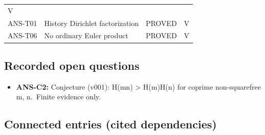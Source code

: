 \documentclass[
  11pt,
]{article}
\providecommand{\tightlist}{%
  \setlength{\itemsep}{0pt}\setlength{\parskip}{0pt}}
\begin{document}
\begin{longtable}[]{@{}llll@{}}
\begin{minipage}[t]{0.10\columnwidth}
V\strut
\end{minipage}\tabularnewline
\begin{minipage}[t]{0.16\columnwidth}\raggedright
ANS-T01\strut
\end{minipage} & \begin{minipage}[t]{0.41\columnwidth}\raggedright
History Dirichlet factorization\strut
\end{minipage} & \begin{minipage}[t]{0.22\columnwidth}\raggedright
PROVED\strut
\end{minipage} & \begin{minipage}[t]{0.10\columnwidth}\raggedright
V\strut
\end{minipage}\tabularnewline
\begin{minipage}[t]{0.16\columnwidth}\raggedright
ANS-T06\strut
\end{minipage} & \begin{minipage}[t]{0.41\columnwidth}\raggedright
No ordinary Euler product\strut
\end{minipage} & \begin{minipage}[t]{0.22\columnwidth}\raggedright
PROVED\strut
\end{minipage} & \begin{minipage}[t]{0.10\columnwidth}\raggedright
V\strut
\end{minipage}\tabularnewline
\bottomrule
\end{longtable}

\hypertarget{recorded-open-questions}{%
\subsection{Recorded open questions}\label{recorded-open-questions}}

\begin{itemize}
\tightlist
\item
  \textbf{ANS-C2:} Conjecture (v001): H(mn) \textgreater{} H(m)H(n) for
  coprime non-squarefree m, n.~Finite evidence only.
\end{itemize}

\hypertarget{connected-entries-cited-dependencies}{%
\subsection{Connected entries (cited
dependencies)}\label{connected-entries-cited-dependencies}}
\end{document}
